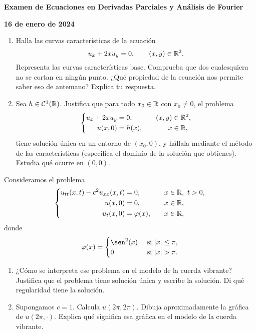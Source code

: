 \documentclass[a4paper, 12pt, extrafontsizes]{memoir}
\begin{document}
\pagestyle{empty}

\begin{center}

    \textbf{Examen de Ecuaciones en Derivadas Parciales y Análisis de Fourier}

    \textbf{16 de enero de 2024}

\end{center}

\begin{exercise}
\hfill
\begin{enumerate}
    \item Halla las curvas características de la ecuación
    \[u_x+2xu_y = 0, \qquad (x,y) \in \mathbb R^2.\]
    Representa las curvas características base. Comprueba que dos cualesquiera no se cortan en ningún punto. ¿Qué propiedad de la ecuación nos permite saber eso de antemano? Explica tu respuesta.
    \item Sea $h \in \mathcal{C}^1(\mathbb R)$. Justifica que para todo $x_0 \in \mathbb R$ con $x_0 \neq 0$, el problema
    \[\left\{\begin{alignedat}{3}
        u_x+2xu_y &= 0, \qquad & (x,y) &\in \mathbb R^2, \\
        u(x,0) &= h(x), \qquad & x &\in \mathbb R,
    \end{alignedat}\right.\]
    tiene solución única en un entorno de $(x_0,0)$, y hállala mediante el método de las características (especifica el dominio de la solución que obtienes). Estudia qué ocurre en $(0,0)$.
\end{enumerate}
\end{exercise}

\begin{exercise}
Consideramos el problema
\[\left\{\begin{alignedat}{3}
    u_{tt}(x,t)-c^2u_{xx}(x,t) &= 0, \qquad & x &\in \mathbb R, \ t > 0, \\
    u(x,0) &= 0, \qquad & x &\in \mathbb R, \\
    u_t(x,0) &= \varphi(x), \qquad & x &\in \mathbb R,
\end{alignedat}\right.\]
donde
\[\varphi(x) = \begin{cases}
    \sen^2(x) & $ si $ |x| \leq \pi, \\
    0 & $ si $ |x| > \pi.
\end{cases}\]
\begin{enumerate}
    \item ¿Cómo se interpreta ese problema en el modelo de la cuerda vibrante? Justifica que el problema tiene solución única y escribe la solución. Di qué regularidad tiene la solución.
    \item Supongamos $c = 1$. Calcula $u(2\pi,2\pi)$. Dibuja aproximadamente la gráfica de $u(2\pi,\cdot)$. Explica qué significa esa gráfica en el modelo de la cuerda vibrante.
\end{enumerate}
\end{exercise}
\end{document}

